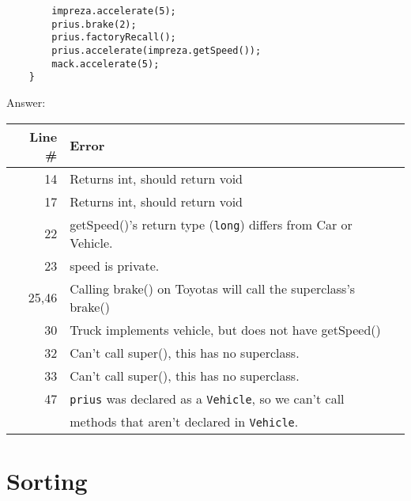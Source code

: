 \documentclass[11pt]{article}
\newenvironment{answer}{\large\lstset{basicstyle=\large\ttfamily}\color{white} \small{Answer:}}{}
\newenvironment{answer}{\large\lstset{basicstyle=\large\ttfamily}\color{red} \small{Answer:}}{}
\begin{document}
\begin{enumerate}
\begin{lstlisting}
		impreza.accelerate(5);
		prius.brake(2);
		prius.factoryRecall();
		prius.accelerate(impreza.getSpeed());
		mack.accelerate(5);
	}
\end{lstlisting}
\begin{answer}
    \begin{tabular}{r l} %
    Line \# & Error \\\hline
    14  	& Returns int, should return void\\
    17  	& Returns int, should return void\\
    22  	& getSpeed()'s return type ({\tt long}) differs from Car or Vehicle.\\
    23  	& speed is private.\\
    25,46	& Calling brake() on Toyotas will call the superclass's brake()\\
    30  	& Truck implements vehicle, but does not have getSpeed()\\
    32  	& Can't call super(), this has no superclass.\\
    33  	& Can't call super(), this has no superclass.\\
    47  	& {\tt prius} was declared as a {\tt Vehicle}, so we can't call\\
    ~  		& methods that aren't declared in {\tt Vehicle}.\\
    \end{tabular}
\end{answer}


\section*{Sorting}



\end{enumerate}
\end{document}
